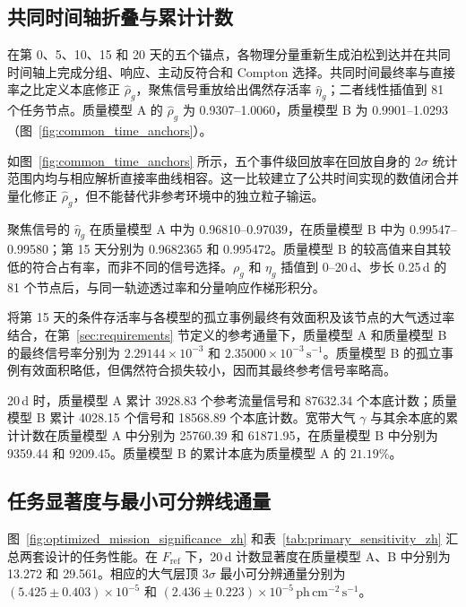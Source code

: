 \documentclass[11pt]{article}
\newcommand{\revblue}[1]{\textcolor{revisionblue}{#1}}
\newcommand{\phcms}{\,\mathrm{ph\,cm^{-2}\,s^{-1}}}
\newcommand{\cps}{\,\mathrm{s^{-1}}}
\newcommand{\fref}{F_{\mathrm{ref}}}
\begin{document}
\FloatBarrier

\subsection{共同时间轴折叠与累计计数}
\label{subsec:mission_fold_validation_zh}

在第 0、5、10、15 和 20 天的五个锚点，各物理分量重新生成泊松到达并在共同时间轴上完成分组、响应、主动反符合和 Compton 选择。共同时间最终率与直接率之比定义本底修正 $\widehat\rho_g$，聚焦信号重放给出偶然存活率 $\widehat\eta_g$；二者线性插值到 81 个任务节点。质量模型 A 的 $\widehat\rho_g$ 为 0.9307--1.0060，质量模型 B 为 0.9901--1.0293（图~\ref{fig:common_time_anchors}）。

如图~\ref{fig:common_time_anchors} 所示，五个事件级回放率在回放自身的 $2\sigma$ 统计范围内均与相应解析直接率曲线相容。这一比较建立了公共时间实现的数值闭合并量化修正 $\widehat\rho_g$，但不能替代非参考环境中的独立粒子输运。

聚焦信号的 $\widehat\eta_g$ 在质量模型 A 中为 0.96810--0.97039，在质量模型 B 中为 0.99547--0.99580；第 15 天分别为 0.9682365 和 0.995472。质量模型 B 的较高值来自其较低的符合占有率，而非不同的信号选择。$\rho_g$ 和 $\eta_g$ 插值到 0--20\,d、步长 0.25\,d 的 81 个节点后，与同一轨迹透过率和分量响应作梯形积分。

\revblue{将第 15 天的条件存活率与各模型的孤立事例最终有效面积及该节点的大气透过率结合，在第~\ref{sec:requirements} 节定义的参考通量下，质量模型 A 和质量模型 B 的最终信号率分别为 $2.29144\times10^{-3}$ 和 $2.35000\times10^{-3}\cps$。质量模型 B 的孤立事例有效面积略低，但偶然符合损失较小，因而其最终参考信号率略高。}

20\,d 时，质量模型 A 累计 3928.83 个参考流量信号和 87632.34 个本底计数；质量模型 B 累计 4028.15 个信号和 18568.89 个本底计数。宽带大气 $\gamma$ 与其余本底的累计计数在质量模型 A 中分别为 25760.39 和 61871.95，在质量模型 B 中分别为 9359.44 和 9209.45。质量模型 B 的累计本底为质量模型 A 的 $21.19\%$。

\subsection{任务显著度与最小可分辨线通量}
\label{subsec:final_mission_performance_zh}

图~\ref{fig:optimized_mission_significance_zh} 和表~\ref{tab:primary_sensitivity_zh} 汇总两套设计的任务性能。在 $\fref$ 下，20\,d 计数显著度在质量模型 A、B 中分别为 13.272 和 29.561。相应的大气层顶 $3\sigma$ 最小可分辨通量分别为 $(5.425\pm0.403)\times10^{-5}$ 和 $(2.436\pm0.223)\times10^{-5}\phcms$。
\end{document}
